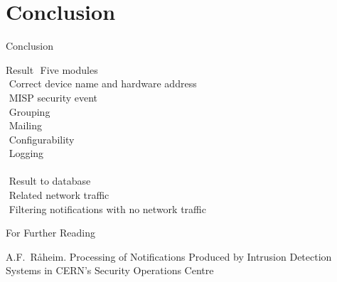 \documentclass{beamer}
\begin{document}
\section{Conclusion}
\begin{frame}{Conclusion}
\begin{block}{Result}
$ $\:  \: Five modules \\
$ $\:  \: Correct device name and hardware address \\
$ $\:  \: MISP security event \\
$ $\:  \: Grouping \\
$ $\:  \: Mailing \\
$ $\:  \: Configurability \\
$ $\:  \: Logging \\
\hfill\\
$ $\:  \: Result to database \\
$ $\:  \: Related network traffic \\
$ $\:  \: Filtering notifications with no network traffic \\
\end{block}
\end{frame}


\begin{frame}{For Further Reading}
\begin{minipage}{0.8\textwidth}
\begin{thebibliography}{10} 
  \beamertemplatearticlebibitems
    A.F.~Råheim.
    \newblock Processing of Notifications Produced by Intrusion Detection Systems in CERN's Security Operations Centre

  \end{thebibliography}
\end{minipage}
\end{frame}
\end{document}
